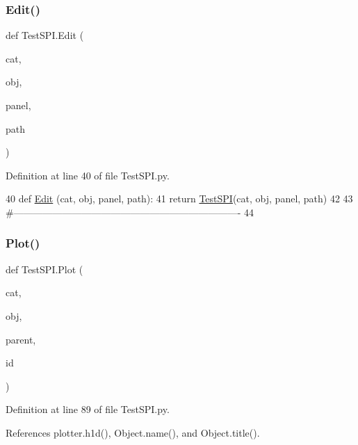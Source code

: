 \subsubsection{\texorpdfstring{Edit()}{Edit()}}
{\footnotesize\ttfamily def Test\+S\+P\+I.\+Edit (\begin{DoxyParamCaption}\item[{}]{cat,  }\item[{}]{obj,  }\item[{}]{panel,  }\item[{}]{path }\end{DoxyParamCaption})}



Definition at line 40 of file Test\+S\+P\+I.\+py.


\begin{DoxyCode}
40 \textcolor{keyword}{def }\hyperlink{namespaceTestSPI_a429973652f05db8fc083bd9fd23aec45}{Edit} (cat, obj, panel, path):
41     \textcolor{keywordflow}{return} \hyperlink{classTestSPI}{TestSPI}(cat, obj, panel, path)
42 
43 \textcolor{comment}{#----------------------------------------------------------------------}
44 
\end{DoxyCode}
\mbox{\label{namespaceTestSPI_aa79a00eee7db10f56d427696a5724a8a}} 
\subsubsection{\texorpdfstring{Plot()}{Plot()}}
{\footnotesize\ttfamily def Test\+S\+P\+I.\+Plot (\begin{DoxyParamCaption}\item[{}]{cat,  }\item[{}]{obj,  }\item[{}]{parent,  }\item[{}]{id }\end{DoxyParamCaption})}



Definition at line 89 of file Test\+S\+P\+I.\+py.



References plotter.\+h1d(), Object.\+name(), and Object.\+title().


